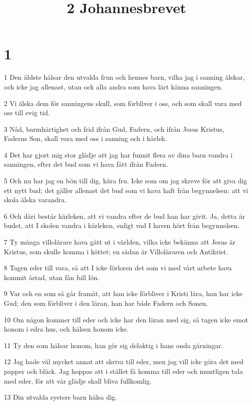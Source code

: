 

\title{2 Johannesbrevet}


\chapter{1}

\par 1 Den äldste hälsar den utvalda frun och hennes barn, vilka jag i sanning älskar, och icke jag allenast, utan ock alla andra som hava lärt känna sanningen.
\par 2 Vi älska dem för sanningens skull, som förbliver i oss, och som skall vara med oss till evig tid.
\par 3 Nåd, barmhärtighet och frid ifrån Gud, Fadern, och ifrån Jesus Kristus, Faderns Son, skall vara med oss i sanning och i kärlek.
\par 4 Det har gjort mig stor glädje att jag har funnit flera av dina barn vandra i sanningen, efter det bud som vi hava fått ifrån Fadern.
\par 5 Och nu har jag en bön till dig, kära fru. Icke som om jag skreve för att giva dig ett nytt bud; det gäller allenast det bud som vi hava haft från begynnelsen: att vi skola älska varandra.
\par 6 Och däri består kärleken, att vi vandra efter de bud han har givit. Ja, detta är budet, att I skolen vandra i kärleken, enligt vad I haven hört från begynnelsen.
\par 7 Ty många villolärare hava gått ut i världen, vilka icke bekänna att Jesus är Kristus, som skulle komma i köttet; en sådan är Villoläraren och Antikrist.
\par 8 Tagen eder till vara, så att I icke förloren det som vi med vårt arbete hava kommit åstad, utan fån full lön.
\par 9 Var och en som så går framåt, att han icke förbliver i Kristi lära, han har icke Gud; den som förbliver i den läran, han har både Fadern och Sonen.
\par 10 Om någon kommer till eder och icke har den läran med sig, så tagen icke emot honom i edra hus, och hälsen honom icke.
\par 11 Ty den som hälsar honom, han gör sig delaktig i hans onda gärningar.
\par 12 Jag hade väl mycket annat att skriva till eder, men jag vill icke göra det med papper och bläck. Jag hoppas att i stället få komma till eder och muntligen tala med eder, för att vår glädje skall bliva fullkomlig.
\par 13 Din utvalda systers barn hälsa dig.


